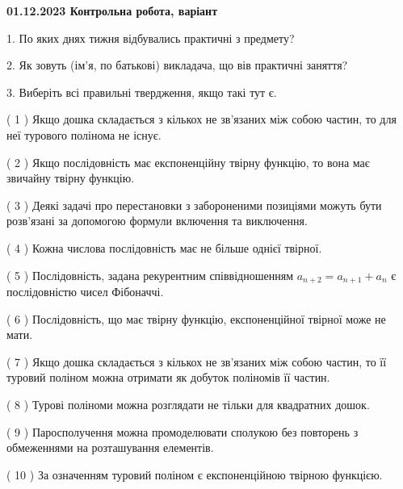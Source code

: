 \documentclass[12pt, ukrainian]{article}
\begin{document}
\vspace{4mm}
\newpage
\begin {large}

\textbf{01.12.2023 Контрольна робота, варіант  }\par


{
1. По яких днях тижня відбувались практичні з предмету?



\vspace{5mm}
2. Як зовуть (ім'я, по батькові) викладача, що вів практичні заняття?



\vspace{5mm}
3. Виберіть всі правильні твердження, якщо такі тут є.\par
\vspace{2mm}
( 1 ) Якщо дошка складається з кількох не зв’язаних між собою частин, то для неї турового полінома не існує.%

( 2 ) Якщо послідовність має експоненційну твірну функцію, то вона має звичайну твірну функцію.%

( 3 ) Деякі задачі про перестановки з забороненими позиціями можуть бути розв’я\-за\-ні за допомогою формули включення та виключення.%

( 4 ) Кожна числова послідовність має не більше однієї твірної.%

( 5 ) Послідовність, задана рекурентним співвідношенням $a_{n+2}=a_{n+1}+a_{n}$ є послідовністю чисел Фібоначчі.%

( 6 ) Послідовність, що має твірну функцію, експоненційної твірної може не мати.%

( 7 ) Якщо дошка складається з кількох не зв’язаних між собою частин, то її туровий поліном можна отримати як добуток поліномів її частин.%

( 8 ) Турові поліноми можна розглядати не тільки для квадратних дошок.%

( 9 ) Паросполучення можна промоделювати сполукою без повторень з обмеженнями на розташування елементів.%

( 10 ) За означенням туровий поліном є експоненційною твірною функцією.%
}
\end {large}
\end{document}
